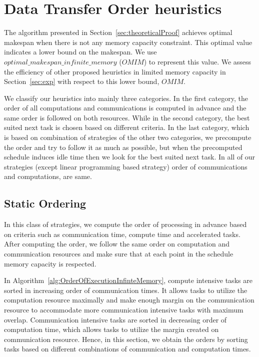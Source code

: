 \documentclass[sigconf]{acmart}
\begin{document}
	
	
	\section{Data Transfer Order heuristics}
	\label{sec:heuristics}
	
	The algorithm presented in Section~\ref{sec:theoreticalProof} achieves optimal makespan when there is not any memory capacity constraint. This optimal value indicates a lower bound on the makespan. We use $optimal\_ \allowbreak makespan\_  \allowbreak infinite\_  \allowbreak memory$ ($OMIM$) to represent this value. We assess the efficiency of other proposed heuristics in limited memory capacity in Section~\ref{sec:exp} with respect to this lower bound, $OMIM$.
	
	
	We classify our heuristics into mainly three categories. In the first category, the order of all computations and communications is computed in advance and the same order is followed on both resources. While in the second category, the best suited next task is chosen based on different criteria. In the last category, which is based on combination of strategies of the other two categories, we precompute the order and try to follow it as much as possible, but when the precomputed schedule induces idle time then we look for the best suited next task. In all of our strategies (except linear programming based strategy) order of communications and computations, are same.
	
	\subsection{Static Ordering}
	In this class of strategies, we compute the order of processing in advance based on criteria such as communication time, compute time and accelerated tasks. After computing the order, we follow the same order on computation and communication resources and make sure that at each point in the schedule memory capacity is respected.
	
	
	In Algorithm~\ref{alg:OrderOfExecutionInfinteMemory}, compute intensive tasks are sorted in increasing order of communication times. It allows tasks to utilize the computation resource maximally and make enough margin on the communication resource to accommodate more communication intensive tasks with maximum overlap. Communication intensive tasks are sorted in decreasing order of computation time, which allows tasks to utilize the margin created on communication resource. Hence, in this section, we obtain the orders by sorting tasks based on different combinations of communication and computation times.
	
\end{document}
